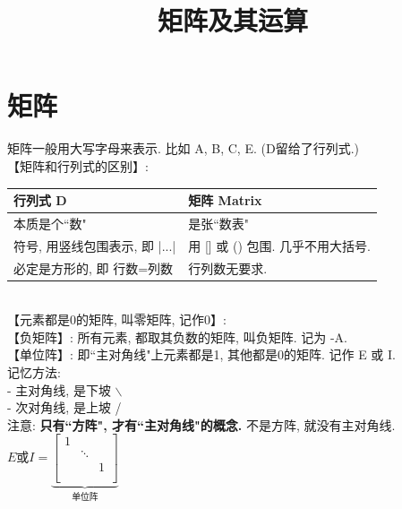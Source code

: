 \documentclass[UTF8]{ctexart}
\title{矩阵及其运算}
\begin{document}
	\tableofcontents %
	\date{} %
	\maketitle  %
	
	\section{矩阵}
	
	矩阵一般用大写字母来表示. 比如 A, B, C, E. (D留给了行列式.) \\
	
	【矩阵和行列式的区别】:\\
	\begin{tabular}{|p{}|p{}|}
		\hline
		行列式 D & 矩阵 Matrix  \\
		\hline
		本质是个``数" & 是张``数表"  \\
		\hline
		符号, 用竖线包围表示, 即 |...| &   用 [] 或 () 包围. 几乎不用大括号.\\
		\hline
		必定是方形的, 即 行数=列数 &  行列数无要求. \\
		\hline
	\end{tabular} \\

	【元素都是0的矩阵, 叫零矩阵, 记作0】: \\
	
	【负矩阵】: 所有元素, 都取其负数的矩阵, 叫负矩阵. 记为 -A. \\
	
	【单位阵】: 即``主对角线"上元素都是1, 其他都是0的矩阵.  记作 E 或 I.\\
	记忆方法:  \\
	- 主对角线, 是下坡 $\backslash$ \\
	- 次对角线, 是上坡 / \\
	
	注意: \textbf{只有``方阵", 才有``主对角线"的概念.} 不是方阵, 就没有主对角线.\\
	
	$
	E\text{或}I=\underset{\text{单位阵}}{\underbrace{\left[ \begin{matrix}
				1&		&		\\
				&		\ddots&		\\
				&		&		1_{}\\
			\end{matrix} \right] }}
	$ \\
	
\end{document}

